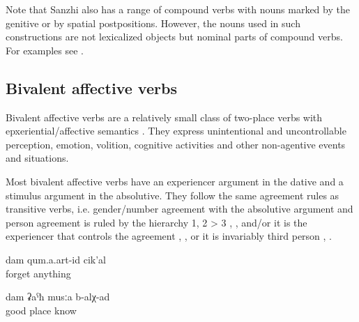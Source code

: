 Note that Sanzhi also has a range of compound verbs with nouns marked by the genitive or by spatial postpositions. However, the nouns used in such constructions are not lexicalized objects but nominal parts of compound verbs. For examples see .


\subsection{Bivalent affective verbs}
\label{sec:Bivalent affective verbs}
Bivalent affective verbs are a relatively small class of two-place verbs with epxeriential\slash affective semantics . They express unintentional and uncontrollable perception, emotion, volition, cognitive activities and other non-agentive events and situations. 

%
\begin{exe}
	\ex	\label{ex:bivalent affective verbs}
	\begin{xlist}
		\ex	{} 
		\ex	{} 
		\ex	{} 
		\ex	{} 
		\ex	{} 
		\ex	{} 
		\ex	{} 
		\ex	{} 
		\ex	{} 
		\ex	{} 
		\ex	{} 
	\end{xlist}
\end{exe}

Most bivalent affective verbs have an experiencer argument in the dative and a stimulus argument in the absolutive. They follow the same agreement rules as transitive verbs, i.e. gender/number agreement with the absolutive argument and person agreement is ruled by the hierarchy 1, 2 > 3 , , and/or it is the experiencer that controls the agreement , , or it is invariably third person , . 


\begin{exe}
	\ex	\label{ex:I did not forget anythingA}
	\gll	dam	qum.a.art-id	cik'al\\
			forget	anything\\
	\glt	{}

	\ex	\label{ex:I know a good place}
	\gll	dam	ʡaˁħ	musːa	b-alχ-ad\\
			good	place	know\\
	\glt	{}
	
\end{exe}


